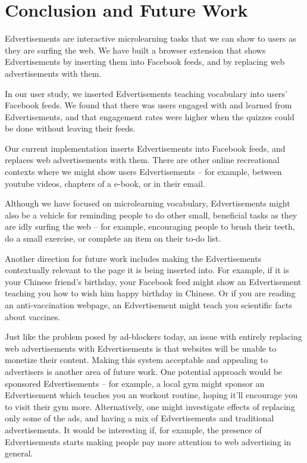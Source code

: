 \documentclass{sigchi}
\begin{document}
\section{Conclusion and Future Work}

Edvertisements are interactive microlearning tasks that we can show to users as they are surfing the web. We have built a browser extension that shows Edvertisements by inserting them into Facebook feeds, and by replacing web advertisements with them.

In our user study, we inserted Edvertisements teaching vocabulary into users' Facebook feeds. We found that there was users engaged with and learned from Edvertisements, and that engagement rates were higher when the quizzes could be done without leaving their feeds.

Our current implementation inserts Edvertisements into Facebook feeds, and replaces web advertisements with them. There are other online recreational contexts where we might show users Edvertisements -- for example, between youtube videos, chapters of a e-book, or in their email.

Although we have focused on microlearning vocabulary, Edvertisements might also be a vehicle for reminding people to do other small, beneficial tasks as they are idly surfing the web -- for example, encouraging people to brush their teeth, do a small exercise, or complete an item on their to-do list.

Another direction for future work includes making the Edvertisements contextually relevant to the page it is being inserted into. For example, if it is your Chinese friend's birthday, your Facebook feed might show an Edvertisement teaching you how to wish him happy birthday in Chinese. Or if you are reading an anti-vaccination webpage, an Edvertisement might teach you scientific facts about vaccines.

Just like the problem posed by ad-blockers today, an issue with entirely replacing web advertisements with Edvertisements is that websites will be unable to monetize their content. Making this system acceptable and appealing to advertisers is another area of future work. One potential approach would be sponsored Edvertisements -- for example, a local gym might sponsor an Edvertisement which teaches you an workout routine, hoping it'll encourage you to visit their gym more. Alternatively, one might investigate effects of replacing only some of the ads, and having a mix of Edvertisements and traditional advertisements. It would be interesting if, for example, the presence of Edvertisements starts making people pay more attention to web advertising in general.
\end{document}
